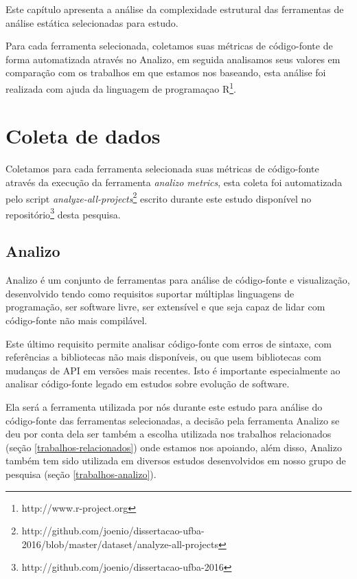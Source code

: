 {Este capítulo apresenta a análise da complexidade estrutural das ferramentas de análise estática selecionadas para estudo.}

Para cada ferramenta selecionada, coletamos suas métricas de código-fonte de
forma automatizada através no Analizo, em seguida analisamos seus valores em
comparação com os trabalhos em que estamos nos baseando, esta análise foi
realizada com ajuda da linguagem de programaçao
R\footnote{http://www.r-project.org}.


\section{Coleta de dados}

Coletamos para cada ferramenta selecionada suas métricas de código-fonte
através da execução da ferramenta {\it analizo metrics}, esta coleta foi
automatizada pelo script {\it
analyze-all-projects}\footnote{http://github.com/joenio/dissertacao-ufba-2016/blob/master/dataset/analyze-all-projects}
escrito durante este estudo disponível no
repositório\footnote{http://github.com/joenio/dissertacao-ufba-2016} desta
pesquisa.

\subsection{Analizo} \label{analizo}

Analizo é um conjunto de ferramentas para análise de código-fonte e
visualização, desenvolvido tendo como requisitos suportar múltiplas linguagens
de programação, ser software livre, ser extensível e que seja capaz de lidar
com código-fonte não mais compilável.

Este último requisito permite analisar código-fonte com erros de sintaxe, com
referências a bibliotecas não mais disponíveis, ou que usem bibliotecas com
mudanças de API em versões mais recentes. Isto é importante especialmente ao
analisar código-fonte legado em estudos sobre evolução de software.

Ela será a ferramenta utilizada por nós durante este estudo para análise do
código-fonte das ferramentas selecionadas, a decisão pela ferramenta Analizo
se deu por conta dela ser também a escolha utilizada nos trabalhos
relacionados (seção \ref{trabalhos-relacionados}) onde estamos nos apoiando,
além disso, Analizo também tem sido utilizada em diversos estudos
desenvolvidos em nosso grupo de pesquisa (seção \ref{trabalhos-analizo}).

